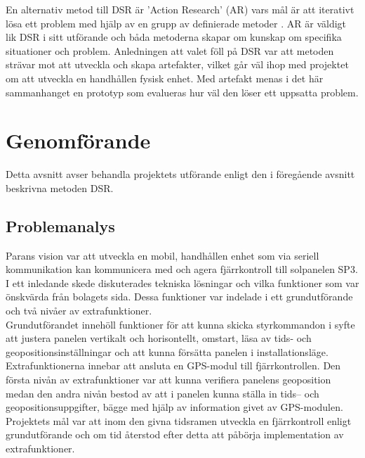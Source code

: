 \documentclass{article}
\begin{document}
        \noindent En alternativ metod till DSR är 'Action Research' (AR) vars mål är att iterativt lösa ett problem med hjälp av en grupp av definierade metoder \cite{actionresearch}. AR är väldigt lik DSR i sitt utförande \cite{designscience} och båda metoderna skapar om kunskap om specifika situationer och problem. Anledningen att valet föll på DSR var att metoden strävar mot att utveckla och skapa artefakter, vilket går väl ihop med projektet om att utveckla en handhållen fysisk enhet. 
        Med artefakt menas i det här sammanhanget en prototyp som evalueras hur väl den löser ett uppsatta problem. 

    \newpage

    \section{Genomförande} %
    \label{sec:genomforande}
        Detta avsnitt avser behandla projektets utförande enligt den i föregående avsnitt beskrivna metoden DSR.
        
        \subsection{Problemanalys} %
        \label{sub:problemanalys}
            Parans vision var att utveckla en mobil, handhållen enhet som via seriell kommunikation kan kommunicera med och agera fjärrkontroll till solpanelen SP3.  I ett inledande skede diskuterades tekniska lösningar och vilka funktioner som var önskvärda från bolagets sida. Dessa funktioner var indelade i ett grundutförande och två nivåer av extrafunktioner. \\
            
            \noindent Grundutförandet innehöll funktioner för att kunna skicka styrkommandon i syfte att justera panelen vertikalt och horisontellt, omstart, läsa av tids- och geopositionsinställningar och att kunna försätta panelen i installationsläge. \\
            
            \noindent Extrafunktionerna innebar att ansluta en GPS-modul till fjärrkontrollen. Den första nivån av extrafunktioner var att kunna verifiera panelens geoposition medan den andra nivån bestod av att i panelen kunna ställa in tids-- och geopositionsuppgifter, bägge med hjälp av information givet av GPS-modulen. Projektets mål var att inom den givna tidsramen utveckla en fjärrkontroll enligt grundutförande och om tid återstod efter detta att påbörja implementation av extrafunktioner.
\end{document}
